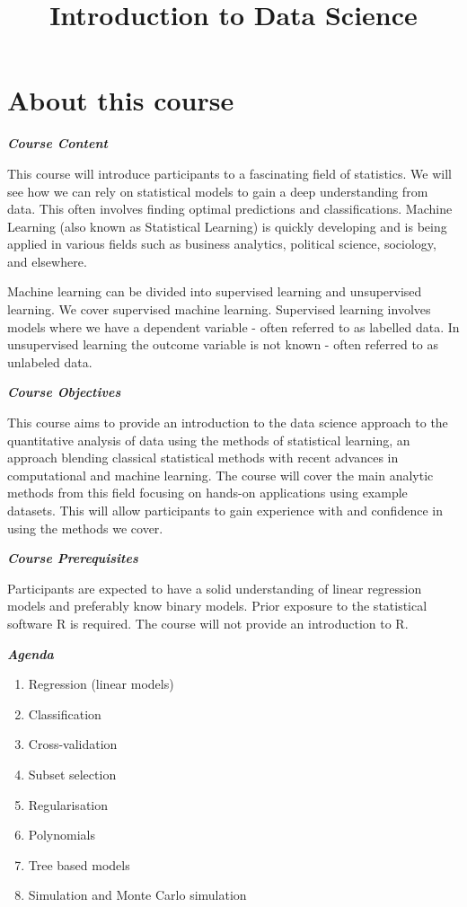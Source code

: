 \documentclass[]{article}
\title{Introduction to Data Science}
\author{}
\date{}
\providecommand{\tightlist}{%
  \setlength{\itemsep}{0pt}\setlength{\parskip}{0pt}}
\begin{document}
\maketitle

{
\setcounter{tocdepth}{2}
\tableofcontents
}
\hypertarget{about-this-course}{%
\section*{About this course}\label{about-this-course}}

\textbf{\emph{Course Content}}

This course will introduce participants to a fascinating field of statistics. We will see how we can rely on statistical models to gain a deep understanding from data. This often involves finding optimal predictions and classifications. Machine Learning (also known as Statistical Learning) is quickly developing and is being applied in various fields such as business analytics, political science, sociology, and elsewhere.

Machine learning can be divided into supervised learning and unsupervised learning. We cover supervised machine learning. Supervised learning involves models where we have a dependent variable - often referred to as labelled data. In unsupervised learning the outcome variable is not known - often referred to as unlabeled data.

\textbf{\emph{Course Objectives}}

This course aims to provide an introduction to the data science approach to the quantitative analysis of data using the methods of statistical learning, an approach blending classical statistical methods with recent advances in computational and machine learning. The course will cover the main analytic methods from this field focusing on hands-on applications using example datasets. This will allow participants to gain experience with and confidence in using the methods we cover.

\textbf{\emph{Course Prerequisites}}

Participants are expected to have a solid understanding of linear regression models and preferably know binary models. Prior exposure to the statistical software R is required. The course will not provide an introduction to R.

\textbf{\emph{Agenda}}

\begin{enumerate}
\def\labelenumi{\arabic{enumi}.}
\tightlist
\item
  Regression (linear models)
\item
  Classification
\item
  Cross-validation
\item
  Subset selection
\item
  Regularisation
\item
  Polynomials
\item
  Tree based models
\item
  Simulation and Monte Carlo simulation
\end{enumerate}
\end{document}
